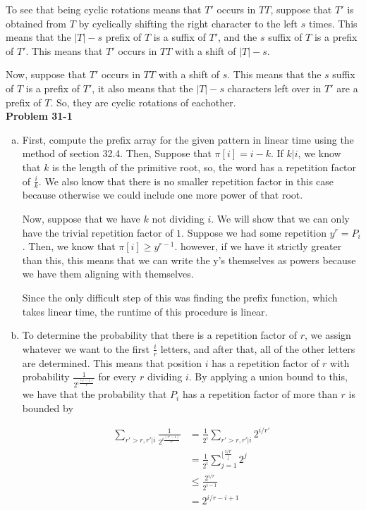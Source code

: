 \documentclass{article}
\begin{document}
To see that being cyclic rotations means that $T'$ occurs in $TT$, suppose that $T'$ is obtained from $T$ by cyclically shifting the right character to the left $s$ times. This means that the $|T|-s$ prefix of $T$ is a suffix of $T'$, and the $s$ suffix of $T$ is a prefix of $T'$. This means that $T'$ occurs in $TT$ with a shift of $|T|-s$.

Now, suppose that $T'$ occurs in $TT$ with a shift of $s$. This means that the $s$ suffix of $T$ is a prefix of $T'$, it also means that the $|T|-s$ characters left over in $T'$ are a prefix of $T$. So, they are cyclic rotations of eachother.\\




\noindent\textbf{Problem 31-1}\\
\begin{enumerate}[a.]
\item
First, compute the prefix array for the given pattern in linear time using the method of section 32.4. Then, Suppose that $\pi[i] = i-k$. If $k | i$, we know that $k$ is the length of the primitive root, so, the word has a repetition factor of $\frac{i}{k}$. We also know that there is no smaller repetition factor in this case because otherwise we could include one more power of that root.

Now, suppose that we have $k$ not dividing $i$. We will show that we can only have the trivial repetition factor of $1$. Suppose we had some repetition $y^r = P_i$. Then, we know that $\pi[i] \ge y^{r-1}$. however, if we have it strictly greater than this, this means that we can write the y's themselves as powers because we have them aligning with themselves.

Since the only difficult step of this was finding the prefix function, which takes linear time, the runtime of this procedure is linear.
\item
To determine the probability that there is a repetition factor of $r$, we assign whatever we want to the first $\frac{i}{r}$ letters, and after that, all of the other letters are determined. This means that position $i$ has a repetition factor of $r$ with probability $\frac{1}{2^{i\frac{(r-1)}{r}}}$ for every $r$ dividing $i$. By applying a union bound to this, we have that the probability that $P_i$ has a repetition factor of more than $r$ is bounded by

\begin{align*}
\sum_{r'>r, r'|i} \frac{1}{2^{i\frac{(r'-1)}{r'}}}& = \frac{1}{2^i}\sum_{r'>r, r' |i}2^{i/r'}\\
&= \frac{1}{2^i} \sum_{j=1}^{\lfloor\frac{i/r}\rfloor}2^{j}\\
&\le \frac{2^{i/r}}{2^{i-1}}\\
&=2^{i/r -i +1}
\end{align*}


\end{enumerate}
\end{document}
